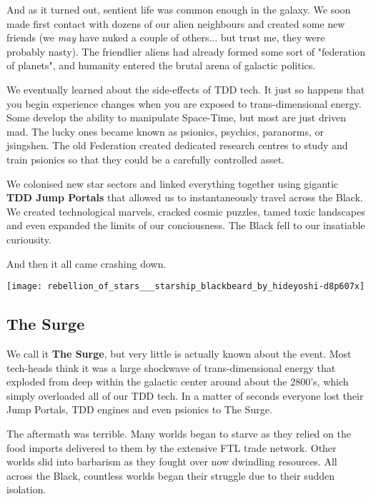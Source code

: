\begin{multicols}{2}
  And as it turned out, sentient life was common enough in the galaxy. We soon made first contact with dozens of our alien neighbours and created some new friends (we \textit{may} have nuked a couple of others... but trust me, they were probably nasty). The friendlier aliens had already formed some sort of "federation of planets", and humanity entered the brutal arena of galactic politics.
  
  We eventually learned about the side-effects of TDD tech. It just so happens that you begin experience changes when you are exposed to trans-dimensional energy. Some develop the ability to manipulate Space-Time, but most are just driven mad. The lucky ones became known as psionics, psychics, paranorms, or jsingshen. The old Federation created dedicated research centres to study and train psionics so that they could be a carefully controlled asset.
  
  We colonised new star sectors and linked everything together using gigantic \textbf{TDD Jump Portals} that allowed us to instantaneously travel across the Black. We created technological marvels, cracked cosmic puzzles, tamed toxic landscapes and even expanded the limits of our conciousness. The Black fell to our insatiable curiousity.

  And then it all came crashing down.
  
  \vspace{\baselineskip}

  \texttt{[image: rebellion\_of\_stars\_\_\_starship\_blackbeard\_by\_hideyoshi-d8p607x]}
  
  \subsection{The Surge}

  We call it \textbf{The Surge}, but very little is actually known about the event. Most tech-heads think it was a large shockwave of trans-dimensional energy that exploded from deep within the galactic center around about the 2800's, which simply overloaded all of our TDD tech. In a matter of seconds everyone lost their Jump Portals, TDD engines and even psionics to The Surge.

  The aftermath was terrible. Many worlds began to starve as they relied on the food imports delivered to them by the extensive FTL trade network. Other worlds slid into barbarism as they fought over now dwindling resources. All across the Black, countless worlds began their struggle due to their sudden isolation.
  

\end{multicols}
